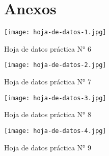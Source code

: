 \section{Anexos}

\begin{ilustracion}[ht]
    \centering
    \texttt{[image: hoja-de-datos-1.jpg]}
    \caption{Hoja de datos práctica N° 6}
    \label{ilus:hoja-de-datos-1}
\end{ilustracion}

\begin{ilustracion}[ht]
    \centering
    \texttt{[image: hoja-de-datos-2.jpg]}
    \caption{Hoja de datos práctica N° 7}
    \label{ilus:hoja-de-datos-2}
\end{ilustracion}

\begin{ilustracion}[ht]
    \centering
    \texttt{[image: hoja-de-datos-3.jpg]}
    \caption{Hoja de datos práctica N° 8}
    \label{ilus:hoja-de-datos-3}
\end{ilustracion}


\begin{ilustracion}[ht]
    \centering
    \texttt{[image: hoja-de-datos-4.jpg]}
    \caption{Hoja de datos práctica N° 9}
    \label{ilus:hoja-de-datos-4}
\end{ilustracion}



% 

% 
